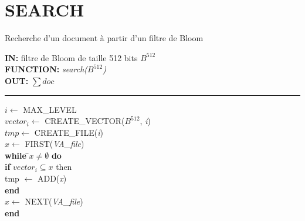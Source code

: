\newpage
\section{SEARCH}
\begin{algorithme}
	Recherche d'un document à partir d'un filtre de Bloom
\end{algorithme}

\begin{flushleft}
	\begin{framed}
		\textbf{IN:} filtre de Bloom de taille 512 bits $B^{512}$\\
		\textbf{FUNCTION:} \textit{search($B^{512}$)}\\
		\textbf{OUT:} \textit{$\sum doc$}\\

		\noindent\rule{\linewidth}{0.5pt}

		\begin{tabbing}
			$i \leftarrow$ MAX\_LEVEL\\
			$vector_i \leftarrow$ CREATE\_VECTOR($B^{512}$, \textit{i})\\
			$tmp \leftarrow$ CREATE\_FILE(\textit{i})\\
			$x \leftarrow$ FIRST(\textit{VA\_file})\\
			
			\textbf{while }\=$x \neq \emptyset $ \textbf{do}\\
					\> \textbf{if }\=$vector_i \subseteq x$ {then}\\
						\>\> tmp $\leftarrow$ ADD(\textit{x})\\
					\> \textbf{end}\\
					\> $x \leftarrow$ NEXT(\textit{VA\_file})\\
			\textbf{end}\\
			

\end{tabbing}
\end{framed}
\end{flushleft}
